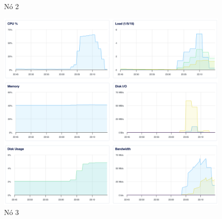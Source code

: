 \begin{figure}[H]
\begin{minipage}{0.32\linewidth}
    \caption{Nó 2}
  \end{minipage}
  \hfill
  \begin{minipage}{0.32\linewidth}
    \centering
    \includegraphics[width=\linewidth]{imgs/3-1-03.png}
    \caption{Nó 3}
  \end{minipage}
\end{figure}

